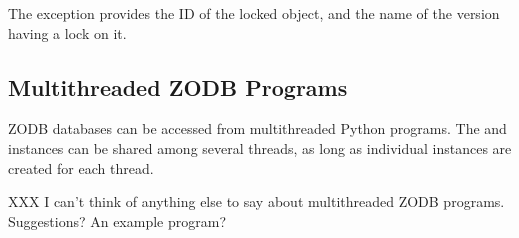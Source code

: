 The exception provides the ID of the locked object, and the name of
the version having a lock on it.

\subsection{Multithreaded ZODB Programs}

ZODB databases can be accessed from multithreaded Python programs.
The  and  instances can be shared among
several threads, as long as individual  instances
are created for each thread.  

XXX I can't think of anything else to say about multithreaded ZODB
programs.  Suggestions?  An example program?

